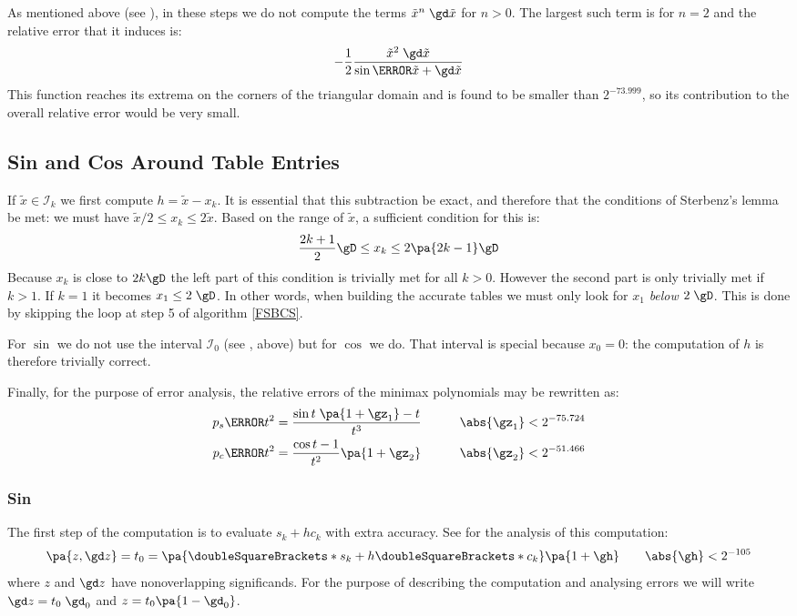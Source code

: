 \documentclass[10pt, a4paper, twoside]{basestyle}
\newcommand{\round}[1]{\doubleSquareBrackets*{#1}}
\newcommand{\red}[1]{\tilde{#1}}
\begin{document}
As mentioned above (see ), in these steps we do not compute the terms ${\red x}^n \; \gd \red x$ for $n > 0$.  The largest such term is for $n = 2$ and the relative error that it induces is:
\[
-\frac{1}{2} \frac{{\red x}^2 \; \gd \red x}{\sin\of{\red x + \gd \red x}}
\]
This function reaches its extrema on the corners of the triangular domain and is found to be smaller than $2^{-73.999}$, so its contribution to the overall relative error would be very small.

\subsection*{Sin and Cos Around Table Entries}\label{interval1}

If $\red x \in \mathscr{I}_k$ we first compute $h = \red x - x_k$.  It is essential that this subtraction be exact, and therefore that the conditions of Sterbenz's lemma be met: we must have $\red x / 2 \le x_k \le 2 \red x$.  Based on the range of $\red x$, a sufficient condition for this is:
\[
\frac{2 k + 1}{2} \gD \le x_k \le 2 \pa{2 k - 1} \gD
\]
Because $x_k$ is close to $2 k \gD$ the left part of this condition is trivially met for all $k > 0$.  However the second part is only trivially met if $k > 1$.  If $k = 1$ it becomes $x_1 \le 2 \; \gD$.  In other words, when building the accurate tables we must only look for $x_1$ \emph{below} $2 \; \gD$.  This is done by skipping the loop at step 5 of algorithm \ref{FSBCS}.

For $\sin$ we do not use the interval $\mathscr{I}_0$ (see , above) but for $\cos$ we do.  That interval is special because $x_0 = 0$: the computation of $h$ is therefore trivially correct.

Finally, for the purpose of error analysis, the relative errors of the minimax polynomials may be rewritten as:
\begin{align*}
p_s\of{t^2} &= \frac{\sin t \; \pa{1 + \gz_1} - t}{t^3} \qquad & \abs{\gz_1} < 2^{-75.724} \\
p_c\of{t^2} &= \frac{\cos t - 1}{t^2} \pa{1 + \gz_2} \qquad & \abs{\gz_2} < 2^{-51.466}
\end{align*}

\subsubsection*{Sin}\label{secerroranalysissin}

The first step of the computation is to evaluate $s_k + h c_k$ with extra accuracy.  See  for the analysis of this computation:
\[
\pa{z, \gd z} = t_0 = \pa{\round{s_k} + h \round{c_k}} \pa{1 + \gh} \qquad \abs{\gh} < 2^{-105}
\]
where $z$ and $\gd z$ have nonoverlapping significands.  For the purpose of describing the computation and analysing errors we will write $\gd z = t_0 \; \gd_0$ and $z = t_0 \pa{1 - \gd_0}$.
\end{document}
